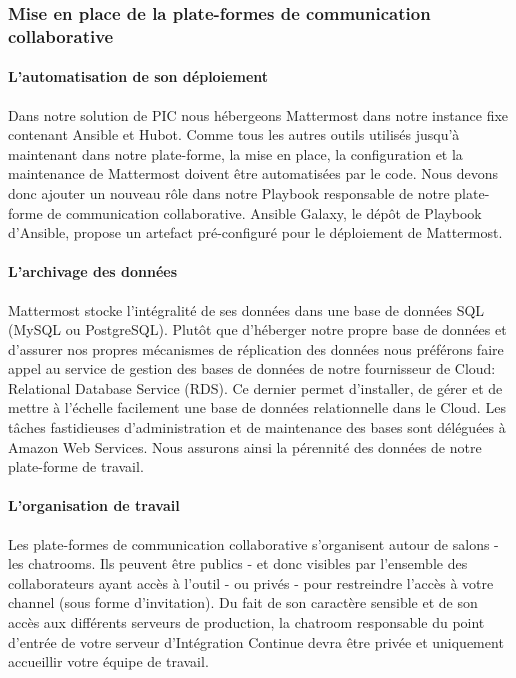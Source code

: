         \subsubsection{Mise en place de la plate-formes de communication collaborative}

          \paragraph{L'automatisation de son déploiement}
          Dans notre solution de PIC nous hébergeons Mattermost dans notre instance fixe contenant Ansible et Hubot. Comme tous les autres outils utilisés jusqu'à maintenant dans notre plate-forme, la mise en place, la configuration et la maintenance de Mattermost doivent être automatisées par le code. Nous devons donc ajouter un nouveau rôle dans notre Playbook responsable de notre plate-forme de communication collaborative. Ansible Galaxy, le dépôt de Playbook d'Ansible, propose un artefact pré-configuré pour le déploiement de Mattermost.

          \paragraph{L'archivage des données}
          Mattermost stocke l'intégralité de ses données dans une base de données SQL (MySQL ou PostgreSQL). Plutôt que d'héberger notre propre base de données et d'assurer nos propres mécanismes de réplication des données nous préférons faire appel au service de gestion des bases de données de notre fournisseur de Cloud: Relational Database Service (RDS). Ce dernier permet d'installer, de gérer et de mettre à l'échelle facilement une base de données relationnelle dans le Cloud. Les tâches fastidieuses d'administration et de maintenance des bases sont déléguées à Amazon Web Services. Nous assurons ainsi la pérennité des données de notre plate-forme de travail.

          \paragraph{L'organisation de travail}
          Les plate-formes de communication collaborative s'organisent autour de salons - les chatrooms. Ils peuvent être publics - et donc visibles par l'ensemble des collaborateurs ayant accès à l'outil - ou privés - pour restreindre l'accès à votre channel (sous forme d'invitation). Du fait de son caractère sensible et de son accès aux différents serveurs de production, la chatroom responsable du point d'entrée de votre serveur d'Intégration Continue devra être privée et uniquement accueillir votre équipe de travail.

